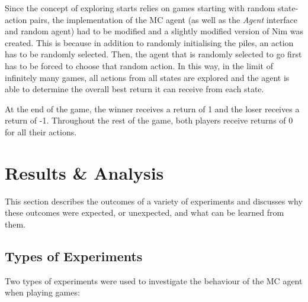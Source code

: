 \documentclass[11pt,a4paper]{report}
\begin{document}
Since the concept of exploring starts relies on games starting with random state-action pairs, the implementation of the MC agent (as well as the \emph{Agent} interface and random agent) had to be modified and a slightly modified version of Nim was created. This is because in addition to randomly initialising the piles, an action has to be randomly selected. Then, the agent that is randomly selected to go first has to be forced to choose that random action. In this way, in the limit of infinitely many games, all actions from all states are explored and the agent is able to determine the overall best return it can receive from each state.

At the end of the game, the winner receives a return of 1 and the loser receives a return of -1. Throughout the rest of the game, both players receive returns of 0 for all their actions.


\chapter{Results \& Analysis}

This section describes the outcomes of a variety of experiments and discusses why these outcomes were expected, or unexpected, and what can be learned from them.


\section{Types of Experiments}
\label{sec:experiment-types}

Two types of experiments were used to investigate the behaviour of the MC agent when playing games:
\end{document}
